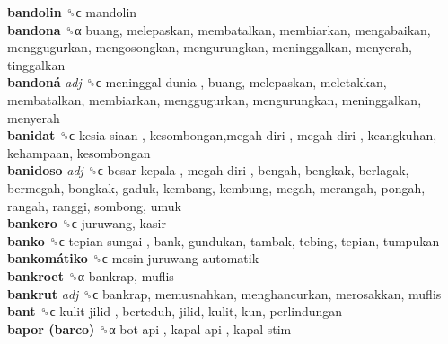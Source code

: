 \textbf{bandolin} ␝ϲ  mandolin  \\
\textbf{bandona} ␝α  buang, melepaskan, membatalkan, membiarkan, mengabaikan, menggugurkan, mengosongkan, mengurungkan, meninggalkan, menyerah, tinggalkan  \\
\textbf{bandoná} \emph{adj}  ␝ϲ   meninggal dunia , buang, melepaskan, meletakkan, membatalkan, membiarkan, menggugurkan, mengurungkan, meninggalkan, menyerah  \\
\textbf{banidat} ␝ϲ   kesia-siaan ,  kesombongan,megah diri ,  megah diri , keangkuhan, kehampaan, kesombongan  \\
\textbf{banidoso} \emph{adj}  ␝ϲ   besar kepala ,  megah diri , bengah, bengkak, berlagak, bermegah, bongkak, gaduk, kembang, kembung, megah, merangah, pongah, rangah, ranggi, sombong, umuk  \\
\textbf{bankero} ␝ϲ  juruwang, kasir  \\
\textbf{banko} ␝ϲ   tepian sungai , bank, gundukan, tambak, tebing, tepian, tumpukan  \\
\textbf{bankomátiko} ␝ϲ   mesin juruwang automatik   \\
\textbf{bankroet} ␝α  bankrap, muflis  \\
\textbf{bankrut} \emph{adj}  ␝ϲ  bankrap, memusnahkan, menghancurkan, merosakkan, muflis  \\
\textbf{bant} ␝ϲ   kulit jilid , berteduh, jilid, kulit, kun, perlindungan  \\
\textbf{bapor (barco)} ␝α   bot api ,  kapal api ,  kapal stim   \\
